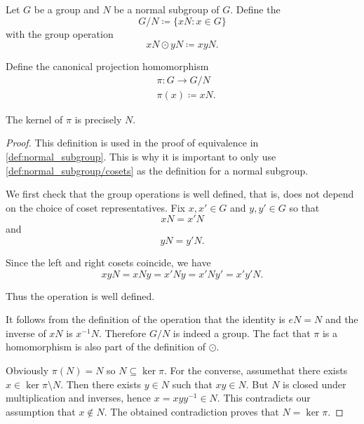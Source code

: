 \begin{definition}\label{def:quotient_group}
  Let \( G \) be a group and \( N \) be a normal subgroup of \( G \). Define the 
  \begin{equation*}
    G / N \coloneqq \{ xN \colon x \in G \}
  \end{equation*}
  with the group operation
  \begin{equation*}
    xN \odot yN \coloneqq xyN.
  \end{equation*}

  Define the canonical projection homomorphism
  \begin{align*}
    &\pi: G \to G / N \\
    &\pi(x) \coloneqq xN.
  \end{align*}

  The kernel of \( \pi \) is precisely \( N \).
\end{definition}
\begin{proof}
  This definition is used in the proof of equivalence in \cref{def:normal_subgroup}. This is why it is important to only use \cref{def:normal_subgroup/cosets} as the definition for a normal subgroup.

  We first check that the group operations is well defined, that is, does not depend on the choice of coset representatives. Fix \( x, x' \in G \) and \( y, y' \in G \) so that
  \begin{equation*}
    xN = x'N
  \end{equation*}
  and
  \begin{equation*}
    yN = y'N.
  \end{equation*}

  Since the left and right cosets coincide, we have
  \begin{equation*}
    xyN = xNy = x'Ny = x'Ny' = x'y'N.
  \end{equation*}

  Thus the operation is well defined.

  It follows from the definition of the operation that the identity is \( eN = N \) and the inverse of \( xN \) is \( x^{-1} N \). Therefore \( G / N \) is indeed a group. The fact that \( \pi \) is a homomorphism is also part of the definition of \( \odot \).

  Obviously \( \pi(N) = N \) so \( N \subseteq \ker \pi \). For the converse, assume\LEM that there exists \( x \in \ker \pi \setminus N \). Then there exists \( y \in N \) such that \( xy \in N \). But \( N \) is closed under multiplication and inverses, hence \( x = xyy^{-1} \in N \). This contradicts our assumption that \( x \not\in N \). The obtained contradiction proves that \( N = \ker \pi \).
\end{proof}


